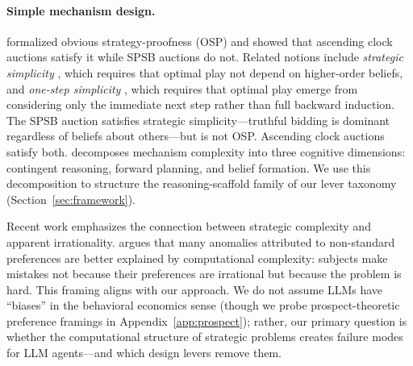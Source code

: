 \paragraph{Simple mechanism design.}
\citet{li2017obviously} formalized obvious strategy-proofness (OSP) and showed that ascending clock auctions satisfy it while SPSB auctions do not. Related notions include \textit{strategic simplicity} \citep{borgers2019strategically}, which requires that optimal play not depend on higher-order beliefs, and \textit{one-step simplicity} \citep{pycia2023theory}, which requires that optimal play emerge from considering only the immediate next step rather than full backward induction. The SPSB auction satisfies strategic simplicity---truthful bidding is dominant regardless of beliefs about others---but is not OSP. Ascending clock auctions satisfy both. \citet{li2024designing} decomposes mechanism complexity into three cognitive dimensions: contingent reasoning, forward planning, and belief formation. We use this decomposition to structure the reasoning-scaffold family of our lever taxonomy (Section~\ref{sec:framework}).

Recent work emphasizes the connection between strategic complexity and apparent irrationality. \citet{oprea2024decisions} argues that many anomalies attributed to non-standard preferences are better explained by computational complexity: subjects make mistakes not because their preferences are irrational but because the problem is hard. This framing aligns with our approach. We do not assume LLMs have ``biases'' in the behavioral economics sense (though we probe prospect-theoretic preference framings in Appendix~\ref{app:prospect}); rather, our primary question is whether the computational structure of strategic problems creates failure modes for LLM agents---and which design levers remove them.

